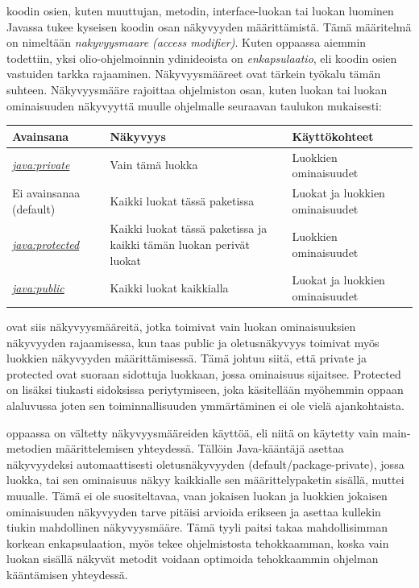\documentclass{tufte-book}
\newcommand{\eng}[1]{\textit{(#1)}}
\newcommand{\new}[1]{\textit{\gls{#1}}}
\newcommand{\neweng}[2]{\new{#1} \eng{#2}}
\newcommand{\java}[1]{\underline{\gls{java:#1}}}
\newcommand{\newjava}[1]{\textit{\java{#1}}}
\begin{document}
 koodin osien, kuten muuttujan, metodin, interface-luokan tai luokan
luominen Javassa tukee kyseisen koodin osan näkyvyyden määrittämistä. Tämä määritelmä on nimeltään 
\neweng{nakyvyysmaare}{access modifier}. Kuten oppaassa aiemmin todettiin, yksi olio-ohjelmoinnin
ydinideoista on \new{enkapsulaatio}, eli koodin osien vastuiden tarkka rajaaminen. Näkyvyysmääreet
ovat tärkein työkalu tämän suhteen. Näkyvyysmääre rajoittaa ohjelmiston osan, kuten luokan tai
luokan ominaisuuden näkyvyyttä muulle ohjelmalle seuraavan taulukon mukaisesti:

\bigskip
\begin{center}
\footnotesize
\begin{tabular}{lll}
\toprule
Avainsana & Näkyvyys & Käyttökohteet \\
\midrule
\newjava{private} & Vain tämä luokka & Luokkien ominaisuudet \\
\addlinespace
Ei avainsanaa (default) & Kaikki luokat tässä paketissa & Luokat ja luokkien ominaisuudet \\
\addlinespace
\newjava{protected} & Kaikki luokat tässä paketissa ja kaikki tämän luokan perivät luokat &
Luokkien ominaisuudet \\
\addlinespace
\newjava{public} & Kaikki luokat kaikkialla & Luokat ja luokkien ominaisuudet \\
\bottomrule
\end{tabular}
\end{center}

 ovat siis näkyvyysmääreitä, jotka toimivat vain luokan
ominaisuuksien näkyvyyden rajaamisessa, kun taas public ja oletusnäkyvyys toimivat myös luokkien
näkyvyyden määrittämisessä. Tämä johtuu siitä, että private ja protected ovat suoraan sidottuja
luokkaan, jossa ominaisuus sijaitsee. Protected on lisäksi tiukasti sidoksissa periytymiseen, joka
käsitellään myöhemmin oppaan alaluvussa  joten sen toiminnallisuuden
ymmärtäminen ei ole vielä ajankohtaista.

 oppaassa on vältetty näkyvyysmääreiden käyttöä, eli niitä on käytetty
vain main-metodien määrittelemisen yhteydessä. Tällöin Java-kääntäjä asettaa näkyvyydeksi
automaattisesti oletusnäkyvyyden (default/package-private), jossa luokka, tai sen ominaisuus näkyy
kaikkialle sen määrittelypaketin sisällä, muttei muualle. Tämä ei ole suositeltavaa, vaan jokaisen
luokan ja luokkien jokaisen ominaisuuden näkyvyyden tarve pitäisi arvioida erikseen ja asettaa
kullekin tiukin mahdollinen näkyvyysmääre. Tämä tyyli paitsi takaa mahdollisimman korkean
enkapsulaation, myös tekee ohjelmistosta tehokkaamman, koska vain luokan sisällä näkyvät metodit
voidaan optimoida tehokkaammin ohjelman kääntämisen yhteydessä.
\end{document}
